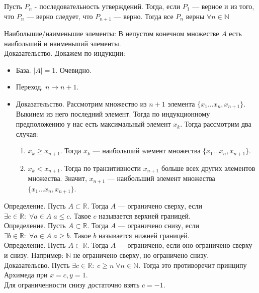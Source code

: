\documentclass[12pt]{article}
\begin{document}
Пусть $P_n$ - последовательность утверждений. Тогда, если  $P_1$ --- верное и из того, что $P_n$ --- верно следует, что  $P_{n+1}$ --- верно. Тогда все $P_n$ верны  $\forall n \in \mathbb{N}$

Наибольшие/наименьшие элементы:
В непустом конечном множестве $A$ есть наибольший и наименьший элементы.\\
Доказательство. Докажем по индукции:
\begin{itemize}
    \item База. $|A| = 1$. Очевидно.
    \item Переход.  $n \to n + 1$.
    \item Доказательство. Рассмотрим множество из  $n + 1$ элемента  $\{x_1\ldots x_n,x_{n+1}\}$. Выкинем из него последний элемент. Тогда по индукционному предположению у нас есть максимальный элемент $x_k$. Тогда рассмотрим два случая:
         \begin{enumerate}
             \item $x_k \ge x_{n+1}$. Тогда $x_k$ --- наибольший элемент множества $\{x_1\ldots x_n,x_{n+1}\}$.
             \item $x_k < x_{n+1}$. Тогда по транзитивности  $x_{n+1}$ больше всех других элементов множества. Значит, $x_{n+1}$ --- наибольший элемент множества $\{x_1\ldots x_n,x_{n+1}\}$.
        \end{enumerate}
\end{itemize}

Определение. Пусть $A \subset \mathbb{R}$. Тогда  $A$ --- ограничено сверху, если  $\exists c \in \mathbb{R}: \; \forall a \in A\; a \le c$. Такое $c$ называется верхней границей.\\

Определение. Пусть $A \subset \mathbb{R}$. Тогда  $A$ --- ограничено снизу, если  $\exists b \in \mathbb{R}: \; \forall a \in A\; a \ge b$. Такое  $b$ называется нижней границей.\\

Определение. Пусть $A \subset \mathbb{R}$. Тогда  $A$ --- ограничено, если оно ограничено сверху и снизу. Например: $\mathbb{N}$ не ограничено сверху, но ограничено снизу.\\

Доказательсво. Пусть $\exists c \in \mathbb{R}: \; c \ge n\; \forall n \in \mathbb{N}$. Тогда это противоречит принципу Архимеда при $x = c, y = 1$. \\ Для ограниченности снизу достаточно взять $c=-1$.\\
\end{document}
